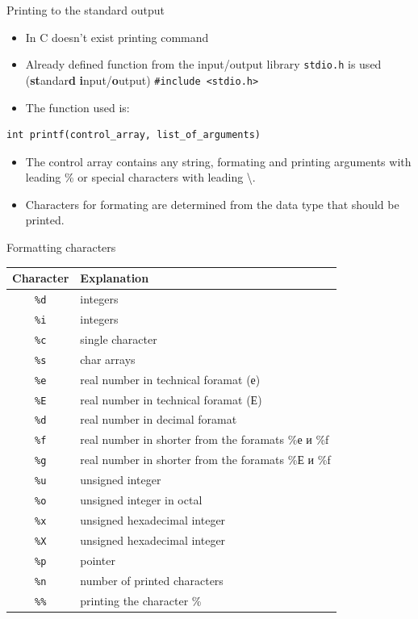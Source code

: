 \begin{frame}[fragile]{Printing to the standard output}
\begin{itemize}
\item In C doesn't exist printing command
\item Already defined function from the input/output library \texttt{stdio.h} is
used (\textbf{st}andar\textbf{d} \textbf{i}nput/\textbf{o}utput)
\large{\texttt{\#include <stdio.h>}}
\item The function used is:
\end{itemize}
\begin{verbatim}
int printf(control_array, list_of_arguments)
\end{verbatim}
\begin{itemize}
\item The control array contains any string, formating and printing arguments
with leading \% or special characters with leading \textbackslash.
\item Characters for formating are determined from the data type that
should be printed.
\end{itemize}
\end{frame}

\begin{frame}{Formatting characters}
\begin{scriptsize}
\begin{tabular}{|c|l|}
\hline \textbf{Character} & \textbf{Explanation} \\ 
\hline \texttt{\%d} & integers \\ 
\hline \texttt{\%i} & integers \\ 
\hline \texttt{\%c} & single character \\ 
\hline \texttt{\%s} & char arrays \\ 
\hline \texttt{\%e} & real number in technical foramat (е) \\
\hline \texttt{\%E} & real number in technical foramat (Е) \\ 
\hline \texttt{\%d} & real number in decimal foramat \\ 
\hline \texttt{\%f} & real number in shorter from the foramats \%е и \%f \\ 
\hline \texttt{\%g} & real number in shorter from the foramats \%Е и \%f \\  
\hline \texttt{\%u} & unsigned integer \\ 
\hline \texttt{\%o} & unsigned integer in octal \\ 
\hline \texttt{\%x} & unsigned hexadecimal integer \\
\hline \texttt{\%X} & unsigned hexadecimal integer \\ 
\hline \texttt{\%p} & pointer \\ 
\hline \texttt{\%n} & number of printed characters \\
\hline \texttt{\%\%} & printing the character \% \\ 
\hline 
\end{tabular} 
\end{scriptsize}
\end{frame}

